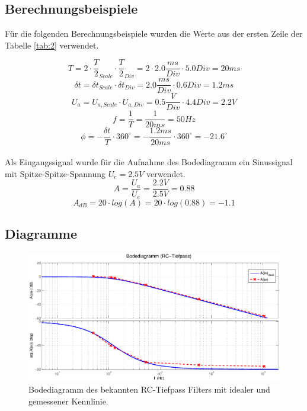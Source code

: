 \documentclass[12pt,a4paper,ngerman]{article}
\begin{document}
\subsection{Berechnungsbeispiele}
Für die folgenden Berechnungsbeispiele wurden die Werte aus der ersten Zeile der Tabelle \ref{tab:2} verwendet.

\begin{equation}
T = 2 \cdot \frac{T}{2}_{Scale} \cdot \frac{T}{2}_{Div} = 2 \cdot 2.0\frac{ms}{Div} \cdot 5.0 Div = 20ms
\end{equation}
\begin{equation}
\delta t = \delta t_{Scale} \cdot \delta t_{Div} = 2.0\frac{ms}{Div} \cdot 0.6Div = 1.2ms
\end{equation}
\begin{equation}
U_a = U_{a,Scale} \cdot U_{a,Div} = 0.5\frac{V}{Div} \cdot 4.4Div = 2.2V
\end{equation}
\begin{equation}
f = \frac{1}{T} = \frac{1}{20ms} = 50Hz
\end{equation}
\begin{equation}
\phi = - \frac{\delta t}{T} \cdot 360^\circ = -\frac{1.2ms}{20ms	} \cdot 360^\circ = -21.6^\circ
\end{equation}\\
Als Eingangssignal wurde für die Aufnahme des Bodediagramm ein Sinussignal mit Spitze-Spitze-Spannung $U_e = 2.5V$ verwendet.
\begin{equation}
A = \frac{U_a}{U_e} = \frac{2.2V}{2.5V} = 0.88
\end{equation}
\begin{equation}
A_{dB} = 20 \cdot log(A) = 20 \cdot log(0.88) = -1.1
\end{equation}

\subsection{Diagramme}
\begin{figure}[H]
\centering
\includegraphics[width=1.1\textwidth]{figures/bode_rc.eps} 
\caption{Bodediagramm des bekannten RC-Tiefpass Filters mit idealer und gemessener Kennlinie.}
\label{fig:bode_bek}
\end{figure}
\end{document}
